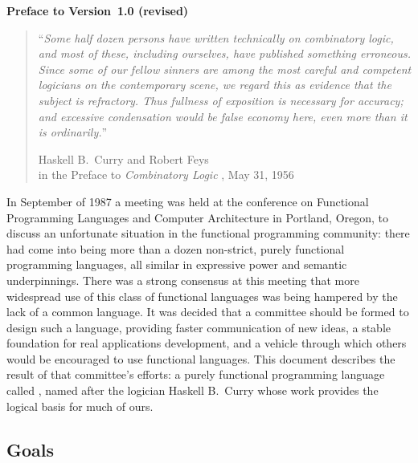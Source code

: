 %
%
\begin{center}
\Large\bf Preface to Version~1.0 (revised)
\end{center}

\vspace{.2in}

\begin{quote}
``{\em Some half dozen persons have written technically on combinatory
logic, and most of these, including ourselves, have published
something erroneous.  Since some of our fellow sinners are among the
most careful and competent logicians on the contemporary scene, we
regard this as evidence that the subject is refractory.  Thus fullness
of exposition is necessary for accuracy; and excessive condensation
would be false economy here, even more than it is ordinarily.}''
\begin{flushright}
Haskell B.~Curry and Robert Feys \\
in the Preface to {\em Combinatory Logic} \cite{curry&feys:book}, May 31, 1956
\end{flushright}
\end{quote}

\vspace{.2in}

\noindent
In September of 1987 a meeting was held at the conference on
Functional Programming
Languages and Computer Architecture in
Portland, Oregon, to discuss an unfortunate situation
in the functional programming community: there had come into being
more than a dozen non-strict, purely functional programming languages,
all similar in expressive power and semantic underpinnings.  There
was a strong consensus at this meeting that more widespread use of
this class of functional languages was
being hampered by the lack of a common language.  It was decided
that a committee should be formed to design such a language, providing
faster communication of new ideas, a stable foundation for real
applications development, and a vehicle through which others
would be encouraged to use functional languages.  This
document describes the result of that committee's efforts: a purely
functional programming language called \Haskell{},
named after the logician Haskell B.~Curry
whose work provides the logical basis for much of ours.

\subsection*{Goals}

